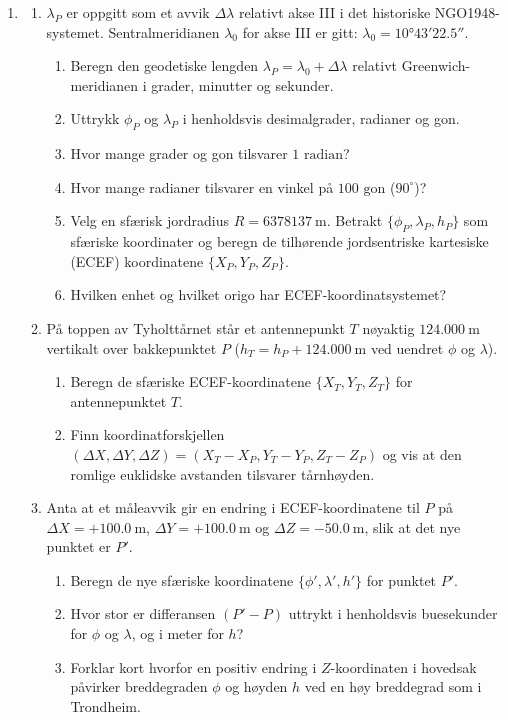 \documentclass[a4paper, norsk, 11pt, twoside]{article}
\begin{document}
\begin{enumerate}
\item 
  \begin{enumerate}
  \item $\lambda_{P}$ er oppgitt som et avvik $\Delta\lambda$ relativt akse III i det historiske NGO1948-systemet. Sentralmeridianen $\lambda_{0}$ for akse III er gitt: $\lambda_{0}=\ang{10;43;22.5}$.
    \begin{enumerate}
    \item Beregn den geodetiske lengden $\lambda_{P} = \lambda_{0} + \Delta\lambda$ relativt Greenwich-meridianen i grader, minutter og sekunder.
    \item Uttrykk $\phi_{P}$ og $\lambda_{P}$ i henholdsvis desimalgrader, radianer og gon.
    \item Hvor mange grader og gon tilsvarer $1\text{ radian}$?
    \item Hvor mange radianer tilsvarer en vinkel på $100\text{ gon}$ ($90^{\circ}$)?
    \item Velg en sfærisk jordradius $R = \SI{6378137}{\meter}$. Betrakt $\{\phi_{P},\lambda_{P},h_{P}\}$ som sfæriske koordinater og beregn de tilhørende jordsentriske kartesiske (ECEF) koordinatene $\{X_{P},Y_{P},Z_{P}\}$.
    \item Hvilken enhet og hvilket origo har ECEF-koordinatsystemet?
    \end{enumerate} 
  \item På toppen av Tyholttårnet står et antennepunkt $T$ nøyaktig $\SI{124.000}{\meter}$ vertikalt over bakkepunktet $P$ ($h_{T} = h_{P} + \SI{124.000}{\meter}$ ved uendret $\phi$ og $\lambda$).
    \begin{enumerate}
    \item Beregn de sfæriske ECEF-koordinatene $\{X_{T}, Y_{T}, Z_{T}\}$ for antennepunktet $T$.
    \item Finn koordinatforskjellen $(\Delta X, \Delta Y, \Delta Z) = (X_T - X_P, Y_T - Y_P, Z_T - Z_P)$ og vis at den romlige euklidske avstanden tilsvarer tårnhøyden.
    \end{enumerate}
  \item Anta at et måleavvik gir en endring i ECEF-koordinatene til $P$ på $\Delta X = +\SI{100.0}{\meter}$, $\Delta Y = +\SI{100.0}{\meter}$ og $\Delta Z = -\SI{50.0}{\meter}$, slik at det nye punktet er $P'$.
    \begin{enumerate}
    \item Beregn de nye sfæriske koordinatene $\{\phi', \lambda', h'\}$ for punktet $P'$.
    \item Hvor stor er differansen $(P' - P)$ uttrykt i henholdsvis buesekunder for $\phi$ og $\lambda$, og i meter for $h$?
    \item Forklar kort hvorfor en positiv endring i $Z$-koordinaten i hovedsak påvirker breddegraden $\phi$ og høyden $h$ ved en høy breddegrad som i Trondheim.
    \end{enumerate}
  \end{enumerate}


\end{enumerate}
\end{document}
